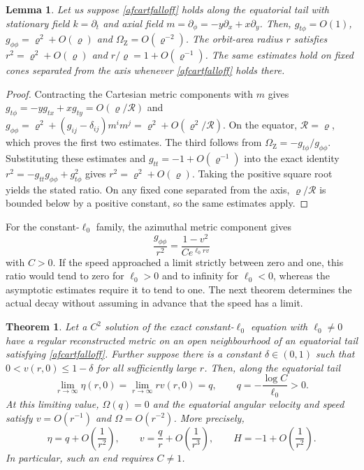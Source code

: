 \documentclass[amsmath,amsfonts,amssymb,aps,pra,superscriptaddress,10pt]{revtex4-2}
\numberwithin{equation}{section}
\theoremstyle{plain}
\newtheorem{theorem}{Theorem}
\newtheorem{lemma}{Lemma}
\theoremstyle{definition}
\theoremstyle{remark}
\theoremstyle{definition}
\newcommand{\ellzero}{\ell_0}
\newcommand{\OmZ}{\Omega_{\mathrm Z}}
\begin{document}
\begin{lemma}\label{afazfalloff}
Let us suppose \eqref{afcartfalloff} holds along the equatorial tail with stationary field $k=\partial_t$ and axial field $m=\partial_\phi=-y\partial_x+x\partial_y$. Then, $g_{t\phi}=O(1)$, $g_{\phi\phi}=\varrho^2+O(\varrho)$ and $\OmZ=O(\varrho^{-2})$. The orbit-area radius $r$ satisfies $r^2=\varrho^2+O(\varrho)$ and $r/\varrho=1+O(\varrho^{-1})$. The same estimates hold on fixed cones separated from the axis whenever \eqref{afcartfalloff} holds there.
\end{lemma}

\begin{proof}
Contracting the Cartesian metric components with $m$ gives $g_{t\phi}=-y g_{tx}+x g_{ty}=O(\varrho/\mathcal R)$ and $g_{\phi\phi}=\varrho^2+(g_{ij}-\delta_{ij})m^im^j=\varrho^2+O(\varrho^2/\mathcal{R})$. On the equator, $\mathcal{R}=\varrho$, which proves the first two estimates. The third follows from $\OmZ=-g_{t\phi}/g_{\phi\phi}$. Substituting these estimates and $g_{tt}=-1+O(\varrho^{-1})$ into the exact identity $r^2=-g_{tt}g_{\phi\phi}+g_{t\phi}^2$ gives $r^2=\varrho^2+O(\varrho)$. Taking the positive square root yields the stated ratio. On any fixed cone separated from the axis, $\varrho/\mathcal{R}$ is bounded below by a positive constant, so the same estimates apply.
\end{proof}

For the constant-$\ellzero$ family, the azimuthal metric component gives
\begin{equation}\label{exgphiphiratio}
\frac{g_{\phi\phi}}{r^2}=\frac{1-v^2}{C e^{\ellzero rv}}
\end{equation}
with $C>0$. If the speed approached a limit strictly between zero and one, this ratio would tend to zero for $\ellzero>0$ and to infinity for $\ellzero<0$, whereas the asymptotic estimates require it to tend to one. The next theorem determines the actual decay without assuming in advance that the speed has a limit.

\begin{theorem}\label{exasconstr}
Let a $C^2$ solution of the exact constant-$\ellzero$ equation with $\ellzero\neq 0$ have a regular reconstructed metric on an open neighbourhood of an equatorial tail satisfying \eqref{afcartfalloff}. Further suppose there is a constant $\delta\in(0,1)$ such that $0<v(r,0)\leq 1-\delta$ for all sufficiently large $r$. Then, along the equatorial tail
\begin{equation}
\lim_{r\to\infty}\eta(r,0)=\lim_{r\to\infty}rv(r,0)=q,\qquad 
q=-\frac{\log{C}}{\ellzero}>0.
\end{equation}
At this limiting value, $\Omega(q)=0$ and the equatorial angular velocity and speed satisfy $v=O(r^{-1})$ and $\Omega=O(r^{-2})$. More precisely,
\begin{equation}
\eta=q+O\left(\frac{1}{r^2}\right),\qquad
v=\frac{q}{r}+O\left(\frac{1}{r^3}\right),\qquad 
H=-1+O\left(\frac{1}{r^2}\right).
\end{equation}
In particular, such an end requires $C\neq 1$.
\end{theorem}
\end{document}
